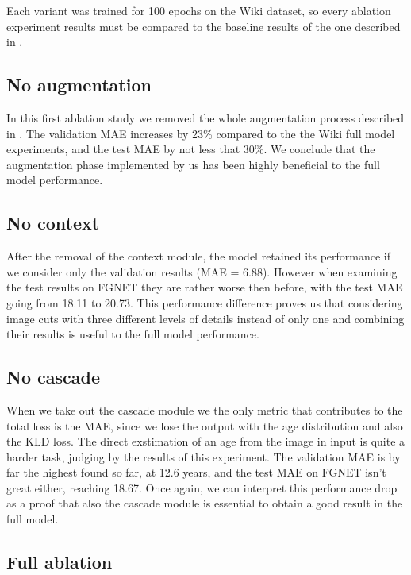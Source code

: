 Each variant was trained for 100 epochs on the Wiki dataset, so every ablation experiment
results must be compared to the baseline results of the one described in .

\subsection{No augmentation}
\label{subsec:no_augmentation}

In this first ablation study we removed the whole augmentation process described 
in . The validation MAE increases by 23\% compared to
the the Wiki full model experiments, and the test MAE by not less that 30\%. 
We conclude that the augmentation phase implemented by us has been highly beneficial 
to the full model performance.

\subsection{No context}
\label{subsec:no_context}

After the removal of the context module, the model retained its performance
if we consider only the validation results (MAE = 6.88). However when examining
the test results on FGNET they are rather worse then before, with the test MAE going 
from 18.11 to 20.73. This performance difference proves us that considering image cuts
with three different levels of details instead of only one and combining their results 
is useful to the full model performance.

\subsection{No cascade}
\label{subsec:no_cascade}

When we take out the cascade module we the only metric that contributes to the total loss is
the MAE, since we lose the output with the age distribution and also the KLD loss.
The direct exstimation of an age from the image in input is quite a harder task, judging
by the results of this experiment.
The validation MAE is by far the highest found so far, at 12.6 years, and the test MAE on FGNET 
isn't great either, reaching 18.67. Once again, we can interpret this performance drop as a 
proof that also the cascade module is essential to obtain a good result in the full model.

\subsection{Full ablation}
\label{subsec:full_ablation}

